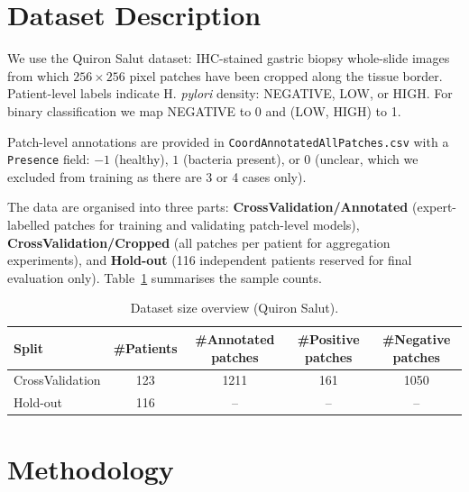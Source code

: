 \documentclass[11pt,a4paper]{article}
\begin{document}
\section{Dataset Description}
\label{sec:dataset}

We use the Quiron Salut dataset: IHC-stained gastric biopsy whole-slide images from which $256\times256$ pixel patches have been cropped along the tissue border. Patient-level labels indicate H.\textit{ pylori} density: NEGATIVE, LOW, or HIGH. For binary classification we map NEGATIVE to 0 and (LOW, HIGH) to 1.

Patch-level annotations are provided in \texttt{CoordAnnotatedAllPatches.csv} with a \texttt{Presence} field: $-1$ (healthy), $1$ (bacteria present), or $0$ (unclear, which we excluded from training as there are 3 or 4 cases only).

The data are organised into three parts: \textbf{CrossValidation/Annotated} (expert-labelled patches for training and validating patch-level models), \textbf{CrossValidation/Cropped} (all patches per patient for aggregation experiments), and \textbf{Hold-out} (116 independent patients reserved for final evaluation only). Table~\ref{tab:dataset_stats} summarises the sample counts.

\begin{table}[H]
\centering
\begin{tabular}{lcccc}
\toprule
Split & \#Patients & \#Annotated patches & \#Positive patches & \#Negative patches \\
\midrule
CrossValidation & 123 & 1211 & 161 & 1050 \\
Hold-out & 116 & -- & -- & -- \\
\bottomrule
\end{tabular}
\caption{Dataset size overview (Quiron Salut).}
\label{tab:dataset_stats}
\end{table}

\section{Methodology}
\label{sec:methodology}
\end{document}
